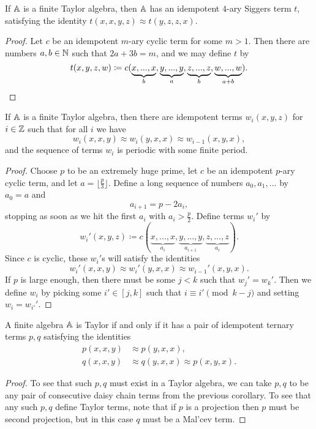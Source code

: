 \documentclass[letterpaper,11pt]{article}
\begin{document}
\begin{cor} If $\mathbb{A}$ is a finite Taylor algebra, then $\mathbb{A}$ has an idempotent $4$-ary Siggers term $t$, satisfying the identity $t(x,x,y,z) \approx t(y,z,z,x)$.
\end{cor}
\begin{proof} Let $c$ be an idempotent $m$-ary cyclic term for some $m > 1$. Then there are numbers $a,b \in \mathbb{N}$ such that $2a+3b = m$, and we may define $t$ by
\[
t(x,y,z,w) \coloneqq c(\underbrace{x,...,x}_{b}, \underbrace{y,...,y}_{a}, \underbrace{z,...,z}_{b}, \underbrace{w,...,w}_{a+b}).\qedhere
\]
\end{proof}

\begin{cor}\label{daisy-chain-terms} If $\mathbb{A}$ is a finite Taylor algebra, then there are idempotent terms $w_i(x,y,z)$ for $i \in \mathbb{Z}$ such that for all $i$ we have
\[
w_i(x,x,y) \approx w_i(y,x,x) \approx w_{i-1}(x,y,x),
\]
and the sequence of terms $w_i$ is periodic with some finite period.
\end{cor}
\begin{proof} Choose $p$ to be an extremely huge prime, let $c$ be an idempotent $p$-ary cyclic term, and let $a = \lfloor\frac{p}{3}\rfloor$. Define a long sequence of numbers $a_0, a_1, ...$ by $a_0 = a$ and
\[
a_{i+1} = p - 2a_i,
\]
stopping as soon as we hit the first $a_i$ with $a_i > \frac{p}{2}$. Define terms $w_i'$ by
\[
w_i'(x,y,z) \coloneqq c(\underbrace{x,...,x}_{a_i}, \underbrace{y,...,y}_{a_{i+1}}, \underbrace{z,...,z}_{a_i}).
\]
Since $c$ is cyclic, these $w_i'$s will satisfy the identities
\[
w_i'(x,x,y) \approx w_i'(y,x,x) \approx w_{i-1}'(x,y,x).
\]
If $p$ is large enough, then there must be some $j < k$ such that $w_j' = w_k'$. Then we define $w_i$ by picking some $i' \in [j,k]$ such that $i \equiv i' \pmod{k-j}$ and setting $w_i = w_{i'}'$.
\end{proof}

\begin{cor}\label{consecutive-daisy} A finite algebra $\mathbb{A}$ is Taylor if and only if it has a pair of idempotent ternary terms $p,q$ satisfying the identities
\begin{align*}
p(x,x,y) &\approx p(y,x,x),\\
q(x,x,y) &\approx q(y,x,x) \approx p(x,y,x).
\end{align*}
\end{cor}
\begin{proof} To see that such $p,q$ must exist in a Taylor algebra, we can take $p,q$ to be any pair of consecutive daisy chain terms from the previous corollary. To see that any such $p,q$ define Taylor terms, note that if $p$ is a projection then $p$ must be second projection, but in this case $q$ must be a Mal'cev term.
\end{proof}
\end{document}
